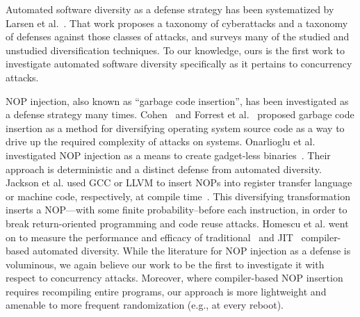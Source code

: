 Automated software diversity as a defense strategy has been systematized by Larsen et al.~\cite{Larsen2014}.
That work proposes a taxonomy of cyberattacks and a taxonomy of defenses against those classes of attacks, and surveys many of the studied and unstudied diversification techniques.
To our knowledge, ours is the first work to investigate automated software diversity specifically as it pertains to concurrency attacks.

NOP injection, also known as ``garbage code insertion'', has been investigated as a defense strategy many times.
Cohen~\cite{Cohen1993} and Forrest et al.~\cite{Forrest1997} proposed garbage code insertion as a method for diversifying operating system source code as a way to drive up the required complexity of attacks on systems.
Onarlioglu et al. investigated NOP injection as a means to create gadget-less binaries~\cite{Onarlioglu2010}.
Their approach is deterministic and a distinct defense from automated diversity.
Jackson et al. used GCC or LLVM to insert NOPs into register transfer language or machine code, respectively, at compile time~\cite{Jackson2013}.
This diversifying transformation inserts a NOP---with some finite probability--before each instruction, in order to break return-oriented programming and code reuse attacks.
Homescu et al. went on to measure the performance and efficacy of traditional~\cite{Homescu2013a} and JIT~\cite{Homescu2013} compiler-based automated diversity.
While the literature for NOP injection as a defense is voluminous, we again believe our work to be the first to investigate it with respect to concurrency attacks.
Moreover, where compiler-based NOP insertion requires recompiling entire programs, our approach is more lightweight and amenable to more frequent randomization (e.g., at every reboot).